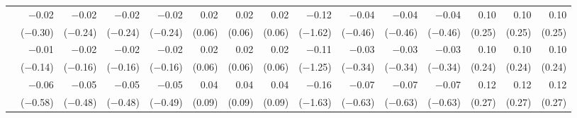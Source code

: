 \begin{tabularx}{1.45\textwidth}{lRRRRRRRRRRRRRR}
		 & \num{-0.02}\phantom{***)} & \num{-0.02}\phantom{***)} & \num{-0.02}\phantom{***)} & \num{-0.02}\phantom{***)} & \num{0.02}\phantom{***)} & \num{0.02}\phantom{***)} & \num{0.02}\phantom{***)} & \num{-0.12}\phantom{***)} & \num{-0.04}\phantom{***)} & \num{-0.04}\phantom{***)} & \num{-0.04}\phantom{***)} & \num{0.10}\phantom{***)} & \num{0.10}\phantom{***)} & \num{0.10}\phantom{***)} \\
		 & (\num{-0.30})\phantom{***} & (\num{-0.24})\phantom{***} & (\num{-0.24})\phantom{***} & (\num{-0.24})\phantom{***} & (\num{0.06})\phantom{***} & (\num{0.06})\phantom{***} & (\num{0.06})\phantom{***} & (\num{-1.62})\phantom{***} & (\num{-0.46})\phantom{***} & (\num{-0.46})\phantom{***} & (\num{-0.46})\phantom{***} & (\num{0.25})\phantom{***} & (\num{0.25})\phantom{***} & (\num{0.25})\phantom{***} \\ [\dspacing]
		 & \num{-0.01}\phantom{***)} & \num{-0.02}\phantom{***)} & \num{-0.02}\phantom{***)} & \num{-0.02}\phantom{***)} & \num{0.02}\phantom{***)} & \num{0.02}\phantom{***)} & \num{0.02}\phantom{***)} & \num{-0.11}\phantom{***)} & \num{-0.03}\phantom{***)} & \num{-0.03}\phantom{***)} & \num{-0.03}\phantom{***)} & \num{0.10}\phantom{***)} & \num{0.10}\phantom{***)} & \num{0.10}\phantom{***)} \\
		 & (\num{-0.14})\phantom{***} & (\num{-0.16})\phantom{***} & (\num{-0.16})\phantom{***} & (\num{-0.16})\phantom{***} & (\num{0.06})\phantom{***} & (\num{0.06})\phantom{***} & (\num{0.06})\phantom{***} & (\num{-1.25})\phantom{***} & (\num{-0.34})\phantom{***} & (\num{-0.34})\phantom{***} & (\num{-0.34})\phantom{***} & (\num{0.24})\phantom{***} & (\num{0.24})\phantom{***} & (\num{0.24})\phantom{***} \\ [\dspacing]
		 & \num{-0.06}\phantom{***)} & \num{-0.05}\phantom{***)} & \num{-0.05}\phantom{***)} & \num{-0.05}\phantom{***)} & \num{0.04}\phantom{***)} & \num{0.04}\phantom{***)} & \num{0.04}\phantom{***)} & \num{-0.16}\phantom{***)} & \num{-0.07}\phantom{***)} & \num{-0.07}\phantom{***)} & \num{-0.07}\phantom{***)} & \num{0.12}\phantom{***)} & \num{0.12}\phantom{***)} & \num{0.12}\phantom{***)} \\
		 & (\num{-0.58})\phantom{***} & (\num{-0.48})\phantom{***} & (\num{-0.48})\phantom{***} & (\num{-0.49})\phantom{***} & (\num{0.09})\phantom{***} & (\num{0.09})\phantom{***} & (\num{0.09})\phantom{***} & (\num{-1.63})\phantom{***} & (\num{-0.63})\phantom{***} & (\num{-0.63})\phantom{***} & (\num{-0.63})\phantom{***} & (\num{0.27})\phantom{***} & (\num{0.27})\phantom{***} & (\num{0.27})\phantom{***} \\ [\dspacing]

\end{tabularx}
